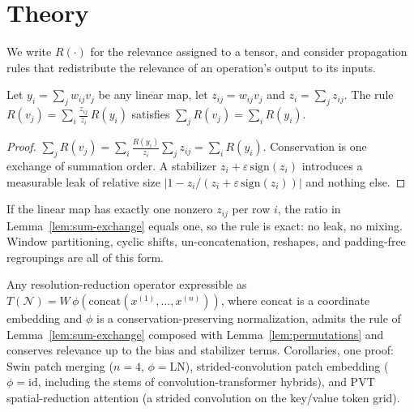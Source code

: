 %

\section{Theory}
\label{sec:theory}

We write $R(\cdot)$ for the relevance assigned to a tensor, and consider
propagation rules that redistribute the relevance of an operation's output to
its inputs.

\begin{lemma}
\label{lem:sum-exchange}
Let $y_i = \sum_j w_{ij} v_j$ be any linear map, let $z_{ij} = w_{ij} v_j$ and
$z_i = \sum_j z_{ij}$. The rule
$R(v_j) = \sum_i \tfrac{z_{ij}}{z_i}\, R(y_i)$
satisfies $\sum_j R(v_j) = \sum_i R(y_i)$.
\end{lemma}

\begin{proof}
$\sum_j R(v_j)
= \sum_i \tfrac{R(y_i)}{z_i} \sum_j z_{ij}
= \sum_i R(y_i)$.
Conservation is one exchange of summation order. A stabilizer
$z_i + \varepsilon\,\mathrm{sign}(z_i)$ introduces a measurable leak of relative
size $|1 - z_i/(z_i+\varepsilon\,\mathrm{sign}(z_i))|$ and nothing else.
\end{proof}

\begin{lemma}
\label{lem:permutations}
If the linear map has exactly one nonzero $z_{ij}$ per row $i$, the ratio in
Lemma~\ref{lem:sum-exchange} equals one, so the rule is exact: no leak, no
mixing. Window partitioning, cyclic shifts, un-concatenation, reshapes, and
padding-free regroupings are all of this form.
\end{lemma}

\begin{proposition}
\label{prop:reduction}
Any resolution-reduction operator expressible as
$T(\mathcal{N}) = W\,\phi(\mathrm{concat}(x^{(1)},\dots,x^{(n)}))$,
where $\mathrm{concat}$ is a coordinate embedding and $\phi$ is a
conservation-preserving normalization, admits the rule of
Lemma~\ref{lem:sum-exchange} composed with Lemma~\ref{lem:permutations} and
conserves relevance up to the bias and stabilizer terms.
Corollaries, one proof: Swin patch merging ($n{=}4$, $\phi{=}\mathrm{LN}$),
strided-convolution patch embedding ($\phi=\mathrm{id}$, including the stems of
convolution-transformer hybrids), and PVT spatial-reduction attention (a
strided convolution on the key/value token grid).
\end{proposition}

